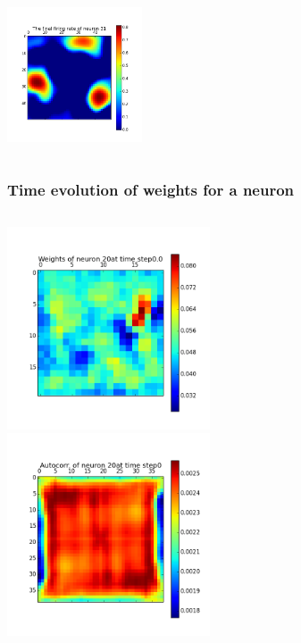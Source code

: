 \begin{frame}
\begin{columns}[t]
\includegraphics[width=4cm,height=4cm]{neurons/neuron_r_31.png}
\end{columns}
\end{frame}


\begin{frame}
\frametitle{Time evolution of weights for a neuron}
\begin{columns}[t]
\centering
\includegraphics[width=6cm,height=6cm]{neurons/neuron_w_20_t_0.png}\\
\centering
\includegraphics[width=6cm,height=6cm]{neurons/neuron_a_20_t_0.png}\\
\end{columns}
\end{frame}

